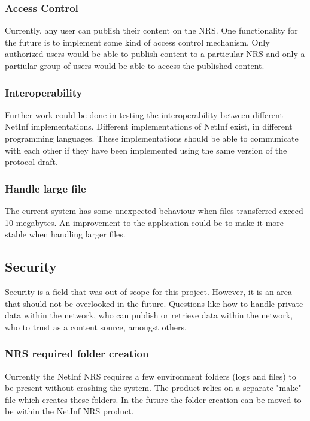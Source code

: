 \subsubsection{Access Control}

Currently, any user can publish their content on the NRS. One functionality for the future is to implement some 
kind of access control mechanism. Only authorized users would be able to publish content to a particular NRS and only a partiular 
group of users would be able to access the published content.

\subsubsection{Interoperability}

Further work could be done in testing the interoperability between different NetInf implementations. Different
implementations of NetInf exist, in different programming languages. These implementations should be able to communicate
with each other if they have been implemented using the same version of the protocol draft. 

\subsubsection{Handle large file}

The current system has some unexpected behaviour when files transferred exceed 10 megabytes. An improvement to the 
application could be to make it more stable when handling larger files.

\subsection{Security}

Security is a field that was out of scope for this project. However, it is an area that should not be overlooked in the future.
Questions like how to handle private data within the network, who can publish or retrieve data within the network, who to trust 
as a content source, amongst others.

\subsubsection{NRS required folder creation}

Currently the NetInf NRS requires a few environment folders (logs and files) to be present without crashing the system. 
The product relies on a separate "make" file which creates these folders. In the future the folder creation can be moved to be within the NetInf NRS product.

